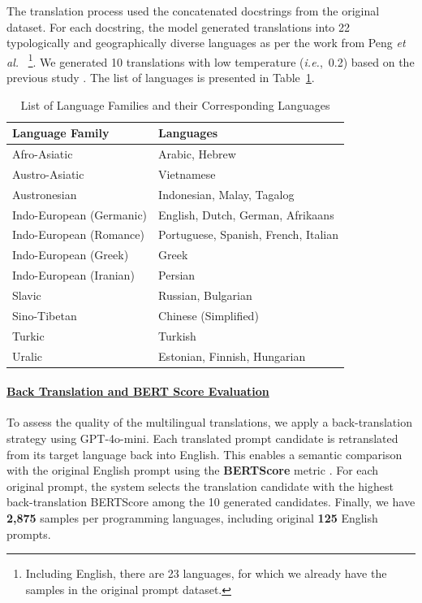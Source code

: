 \documentclass[pdflatex,sn-mathphys-ay]{sn-jnl}
\newcommand{\ie}{\textit{i.e.},\ }
\newcommand{\etal}{\textit{et al.} }
\begin{document}
The translation process used the concatenated docstrings from the original dataset. For each docstring, the model generated translations into 22 typologically and geographically diverse languages as per the work from Peng \etal~\cite{peng-etal-2024-humaneval}\footnote{Including English, there are 23 languages, for which we already have the samples in the original prompt dataset.}. We generated 10 translations with low temperature (\ie 0.2) based on the previous study \cite{peng-etal-2024-humaneval}. The list of languages is presented in Table~\ref{tab:language_table}. 
\begin{table}[h]
  \centering
  \caption{List of Language Families and their Corresponding Languages}
  \label{tab:language_table}
  \begin{tabular}{l|l}
    \hline
    \textbf{Language Family} & \textbf{Languages} \\ 
    \hline
    Afro-Asiatic & Arabic, Hebrew \\ 
    \hline
    Austro-Asiatic & Vietnamese \\ 
    \hline
    Austronesian & Indonesian, Malay, Tagalog \\ 
    \hline
    Indo-European (Germanic) & English, Dutch, German, Afrikaans \\ 
    \hline
    Indo-European (Romance) & Portuguese, Spanish, French, Italian \\ 
    \hline
    Indo-European (Greek) & Greek \\ 
    \hline
    Indo-European (Iranian) & Persian \\ 
    \hline
    Slavic & Russian, Bulgarian \\ 
    \hline
    Sino-Tibetan & Chinese (Simplified) \\ 
    \hline
    Turkic & Turkish \\ 
    \hline
    Uralic & Estonian, Finnish, Hungarian \\ 
    \hline
  \end{tabular}
\end{table}

\paragraph{\underline{Back Translation and BERT Score Evaluation}}
To assess the quality of the multilingual translations, we apply a back-translation strategy using GPT-4o-mini. Each translated prompt candidate is retranslated from its target language back into English. This enables a semantic comparison with the original English prompt using the \textbf{BERTScore} metric \cite{zhang2020bertscoreevaluatingtextgeneration}. For each original prompt, the system selects the translation candidate with the highest back-translation BERTScore among the 10 generated candidates. Finally, we have \textbf{2,875} samples per programming languages, including original \textbf{125} English prompts.
\end{document}
